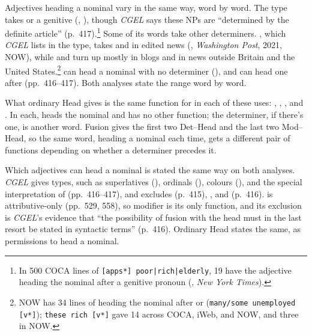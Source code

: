 Adjectives heading a nominal vary in the same way, word by word. The  type takes  or a genitive (, ), though \textit{CGEL} says these NPs are \enquote{determined by the definite article} (p.~417).\footnote{In 500 COCA lines of \texttt{[apps*] poor|rich|elderly}, 19 have the adjective heading the nominal after a genitive pronoun (, \textit{New York Times}).} Some of its words take other determiners. , which \textit{CGEL} lists in the type, takes  and  in edited news (, \textit{Washington Post}, 2021, NOW), while  and  turn up mostly in blogs and in news outside Britain and the United States.\footnote{NOW has 34 lines of  heading the nominal after  or  (\texttt{many/some unemployed [v*]}); \texttt{these rich [v*]} gave 14 across COCA, iWeb, and NOW, and  three in NOW.}  can head a nominal with no determiner (), and  can head one after  (pp.~416--417). Both analyses state the range word by word.

What ordinary Head gives is the same function for  in each of these uses: , , , and . In each,  heads the nominal and has no other function; the determiner, if there's one, is another word. Fusion gives the first two Det--Head and the last two Mod--Head, so the same word, heading a nominal each time, gets a different pair of functions depending on whether a determiner precedes it.

Which adjectives can head a nominal is stated the same way on both analyses. \textit{CGEL} gives types, such as superlatives (), ordinals (), colours (), and the special interpretation of  (pp.~416--417), and excludes  (p.~415), , and  (p.~416).  is attributive-only (pp.~529, 558), so modifier is its only function, and its exclusion is \textit{CGEL}'s evidence that \enquote{the possibility of fusion with the head must in the last resort be stated in syntactic terms} (p.~416). Ordinary Head states the same, as permissions to head a nominal.


